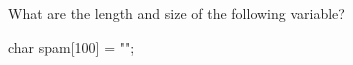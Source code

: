 What are the length and size of the following variable?

\begin{consolethree}[escapeinside=||]

char spam[100] = "";

\end{consolethree}

